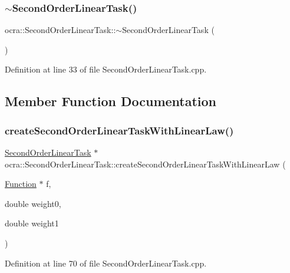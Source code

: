\subsubsection{\texorpdfstring{$\sim$\+Second\+Order\+Linear\+Task()}{~SecondOrderLinearTask()}}
{\footnotesize\ttfamily ocra\+::\+Second\+Order\+Linear\+Task\+::$\sim$\+Second\+Order\+Linear\+Task (\begin{DoxyParamCaption}{ }\end{DoxyParamCaption})}



Definition at line 33 of file Second\+Order\+Linear\+Task.\+cpp.



\subsection{Member Function Documentation}
\hypertarget{classocra_1_1SecondOrderLinearTask_a9d9b45129ef6c513cf67bc55c33aae05}{}\label{classocra_1_1SecondOrderLinearTask_a9d9b45129ef6c513cf67bc55c33aae05} 
\subsubsection{\texorpdfstring{create\+Second\+Order\+Linear\+Task\+With\+Linear\+Law()}{createSecondOrderLinearTaskWithLinearLaw()}\hspace{0.1cm}{\footnotesize\ttfamily [1/2]}}
{\footnotesize\ttfamily \hyperlink{classocra_1_1SecondOrderLinearTask}{Second\+Order\+Linear\+Task} $\ast$ ocra\+::\+Second\+Order\+Linear\+Task\+::create\+Second\+Order\+Linear\+Task\+With\+Linear\+Law (\begin{DoxyParamCaption}\item[{\hyperlink{classocra_1_1Function}{Function} $\ast$}]{f,  }\item[{double}]{weight0,  }\item[{double}]{weight1 }\end{DoxyParamCaption})\hspace{0.3cm}{\ttfamily [static]}}



Definition at line 70 of file Second\+Order\+Linear\+Task.\+cpp.

